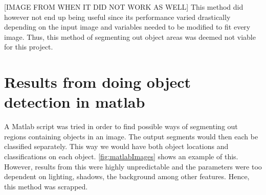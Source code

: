 [IMAGE FROM WHEN IT DID NOT WORK AS WELL]
This method did however not end up being useful since its performance varied drastically depending on the input image and variables needed to be modified to fit every image. Thus, this method of segmenting out object areas was deemed not viable for this project.

\section{Results from doing object detection in matlab}
\label{sec:ODresults}
A Matlab script was tried in order to find possible ways of segmenting out regions containing objects in an image. The output segments would then each be classified separately. This way we would have both object locations and classifications on each object. \ref{fig:matlabImages} shows an example of this. However, results from this were highly unpredictable and the parameters were too dependent on lighting, shadows, the background among other features. Hence, this method was scrapped.


\newpage
